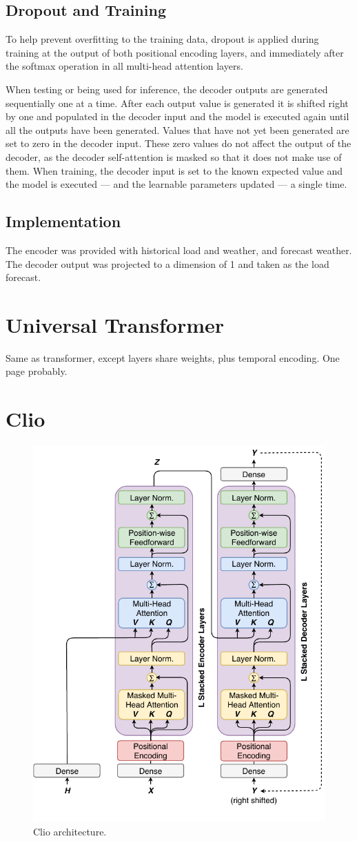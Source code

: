 \subsection{Dropout and Training}
To help prevent overfitting to the training data, dropout \cite{srivastava14a} is applied during training at the output of both positional encoding layers, and immediately after the softmax operation in all multi-head attention layers.

When testing or being used for inference, the decoder outputs are generated sequentially one at a time.
After each output value is generated it is shifted right by one and populated in the decoder input and the model is executed again until all the outputs have been generated.
Values that have not yet been generated are set to zero in the decoder input.
These zero values do not affect the output of the decoder, as the decoder self-attention is masked so that it does not make use of them.
When training, the decoder input is set to the known expected value and the model is executed --- and the learnable parameters updated --- a single time.

\subsection{Implementation}
The encoder was provided with historical load and weather, and forecast weather.
The decoder output was projected to a dimension of 1 and taken as the load forecast.

\section{Universal Transformer}
Same as transformer, except layers share weights, plus temporal encoding. One page probably.

\section{Clio}

\begin{figure}[htbp]
	\centerline{\includegraphics[width=.35\textwidth]{images/clio.pdf}}
	\caption{Clio architecture.}
	\label{fig:clio}
\end{figure}


